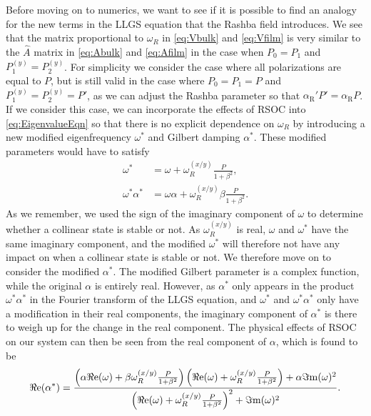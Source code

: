 Before moving on to numerics, we want to see if it is possible to find an analogy for the new terms in the LLGS equation that the Rashba field introduces. We see that the matrix proportional to $\omega_R$ in \eqref{eq:Vbulk} and \eqref{eq:Vfilm} is very similar to the $\hat{A}$ matrix in \eqref{eq:Abulk} and \eqref{eq:Afilm} in the case when $P_0=P_1$ and $P_1^{(y)}=P_2^{(y)}$. For simplicity we consider the case where all polarizations are equal to $P$, but is still valid in the case where $P_0=P_1=P$ and $P_1^{(y)}=P_2^{(y)}=P'$, as we can adjust the Rashba parameter so that $\alpha_{\text{R}}'P' = \alpha_{\text{R}}P$. If we consider this case, we can incorporate the effects of RSOC into \eqref{eq:EigenvalueEqn} so that there is no explicit dependence on $\omega_R$ by introducing a new modified eigenfrequency $\omega^*$ and Gilbert damping $\alpha^*$. These modified parameters would have to satisfy
\begin{subequations}
\begin{align}
    \omega^* &= \omega+\omega_R^{(x/y)}\frac{P}{1+\beta^2}, \\
    \omega^*\alpha^* &= \omega\alpha+\omega_R^{(x/y)}\beta\frac{P}{1+\beta^2}.
\end{align}
\end{subequations}
As we remember, we used the sign of the imaginary component of $\omega$ to determine whether a collinear state is stable or not. As $\omega_R^{(x/y)}$ is real, $\omega$ and $\omega^*$ have the same imaginary component, and the modified $\omega^*$ will therefore not have any impact on when a collinear state is stable or not. We therefore move on to consider the modified $\alpha^*$. The modified Gilbert parameter is a complex function, while the original $\alpha$ is entirely real. However, as $\alpha^*$ only appears in the product $\omega^*\alpha^*$ in the Fourier transform of the LLGS equation, and $\omega^*$ and $\omega^*\alpha^*$ only have a modification in their real components, the imaginary component of $\alpha^*$ is there to weigh up for the change in the real component. The physical effects of RSOC on our system can then be seen from the real component of $\alpha$, which is found to be
\begin{align}
    {\Re\mathrm{e}}(\alpha^*) = \frac{\left(\alpha{\Re\mathrm{e}}(\omega) + \beta\omega^{(x/y)}_R \frac{P}{1+\beta^2}\right)\left({\Re\mathrm{e}}(\omega) + \omega^{(x/y)}_R \frac{P}{1+\beta^2}\right) + \alpha{\Im\mathrm{m}}(\omega)^2}{\left({\Re\mathrm{e}}(\omega) + \omega^{(x/y)}_R \frac{P}{1+\beta^2}\right)^2+{\Im\mathrm{m}}(\omega)^2}.
\end{align}
